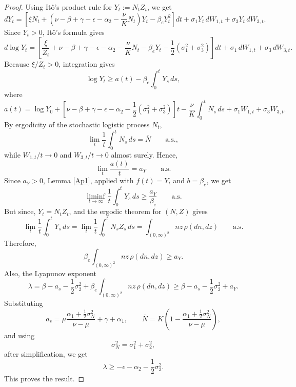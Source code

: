 \documentclass[10pt,a4paper]{amsart}
\begin{document}
\begin{proof}
Using It\^o's product rule for $Y_t:=N_tZ_t$, we get
$$
dY_t=\left[\xi N_t+\left(\nu-\beta+\gamma-\epsilon-\alpha_2
-\frac{\nu}{K}N_t\right)Y_t-\beta_eY_t^2\right]dt
+\sigma_1Y_t\,dW_{1,t}+\sigma_3Y_t\,dW_{3,t}.
$$
Since $Y_t>0$, It\^o's formula gives
$$
d\log Y_t=\left[\frac{\xi}{Z_t}+\nu-\beta+\gamma-\epsilon-\alpha_2-\frac{\nu}{K}N_t-\beta_eY_t-\frac12(\sigma_1^2+\sigma_3^2)
\right]dt+\sigma_1\,dW_{1,t}+\sigma_3\,dW_{3,t}.
$$
Because $\xi/Z_t>0$, integration gives
$$
\log Y_t \geq a(t)-\beta_e\int_0^tY_s\,ds,
$$
where
$$
a(t)=\log Y_0+\left[\nu-\beta+\gamma-\epsilon-\alpha_2
-\frac12(\sigma_1^2+\sigma_3^2)\right]t
-\frac{\nu}{K}\int_0^tN_s\,ds+\sigma_1W_{1,t}+\sigma_3W_{3,t}.
$$
By ergodicity of the stochastic logistic process $N_t$,
$$
\lim_t \frac1t\int_0^tN_s\,ds
=
\overline N
\qquad\text{a.s.},
$$
while $W_{1,t}/t\to0$ and $W_{3,t}/t\to0$ almost surely. Hence,
$$
\lim_t \frac{a(t)}{t}= a_Y
\qquad\text{a.s.}
$$
Since $a_Y>0$, Lemma \ref{Ap1}, applied with
$f(t)=Y_t$ and $b=\beta_e$, we get
$$
\liminf_{t\to\infty}
\frac1t\int_0^tY_s\,ds
\geq
\frac{a_Y}{\beta_e}
\qquad\text{a.s.}
$$
But since, $Y_t=N_tZ_t$, and the ergodic theorem for
$(N,Z)$ gives
$$
\lim_t \frac1t\int_0^tY_s\,ds
=\lim_t \frac1t\int_0^tN_sZ_s\,ds= \int_{(0,\infty)^2}nz\,\rho(dn,dz)
\qquad\text{a.s.}
$$
Therefore,
$$
\beta_e\int_{(0,\infty)^2}nz\,\rho(dn,dz)
\geq a_Y.
$$
Also, the Lyapunov exponent
$$
\lambda=\beta-a_s-\frac12\sigma_2^2+\beta_e\int_{(0,\infty)^2}nz\,\rho(dn,dz) \geq
\beta-a_s-\frac12\sigma_2^2+a_Y.
$$
Substituting
$$
a_s
=
\mu\frac{\alpha_1+\frac12\sigma_N^2}{\nu-\mu}
+\gamma+\alpha_1,
\qquad
\overline N
=
K\left(
1-\frac{\alpha_1+\frac12\sigma_N^2}{\nu-\mu}
\right),
$$
and using
$$
\sigma_N^2=\sigma_1^2+\sigma_2^2,
$$
after simplification, we get
$$
\lambda
\geq
-\epsilon-\alpha_2-\frac12\sigma_3^2.
$$
This proves the result.
\end{proof}
\end{document}
